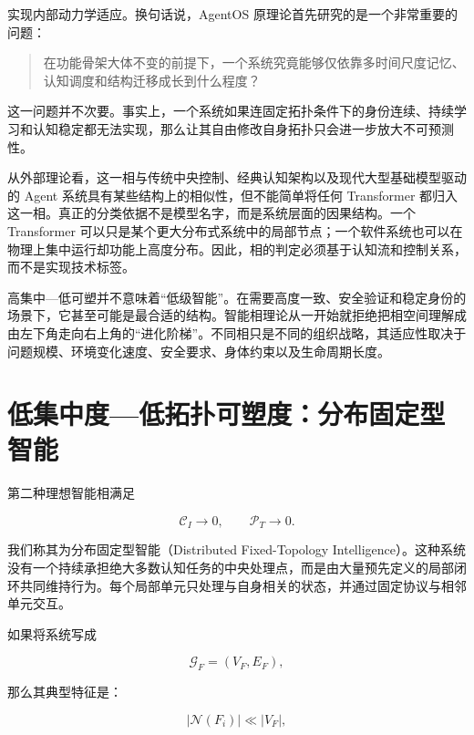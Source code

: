 实现内部动力学适应。换句话说，AgentOS 原理论首先研究的是一个非常重要的问题：

\begin{quote}
在功能骨架大体不变的前提下，一个系统究竟能够仅依靠多时间尺度记忆、认知调度和结构迁移成长到什么程度？
\end{quote}

这一问题并不次要。事实上，一个系统如果连固定拓扑条件下的身份连续、持续学习和认知稳定都无法实现，那么让其自由修改自身拓扑只会进一步放大不可预测性。

从外部理论看，这一相与传统中央控制、经典认知架构以及现代大型基础模型驱动的 Agent 系统具有某些结构上的相似性，但不能简单将任何 Transformer 都归入这一相。真正的分类依据不是模型名字，而是系统层面的因果结构。一个 Transformer 可以只是某个更大分布式系统中的局部节点；一个软件系统也可以在物理上集中运行却功能上高度分布。因此，相的判定必须基于认知流和控制关系，而不是实现技术标签。

高集中—低可塑并不意味着“低级智能”。在需要高度一致、安全验证和稳定身份的场景下，它甚至可能是最合适的结构。智能相理论从一开始就拒绝把相空间理解成由左下角走向右上角的“进化阶梯”。不同相只是不同的组织战略，其适应性取决于问题规模、环境变化速度、安全要求、身体约束以及生命周期长度。

\section{低集中度—低拓扑可塑度：分布固定型智能}
\label{sec:distributed_fixed_phase}

第二种理想智能相满足

\begin{equation}
\mathcal{C}_{I}\rightarrow0,
\qquad
\mathcal{P}_{T}\rightarrow0.
\end{equation}

我们称其为分布固定型智能（Distributed Fixed-Topology Intelligence）。这种系统没有一个持续承担绝大多数认知任务的中央处理点，而是由大量预先定义的局部闭环共同维持行为。每个局部单元只处理与自身相关的状态，并通过固定协议与相邻单元交互。

如果将系统写成

\begin{equation}
\mathcal{G}_{F}
=
(V_F,E_F),
\end{equation}

那么其典型特征是：

\begin{equation}
|\mathcal{N}(F_i)|
\ll
|V_F|,
\end{equation}

